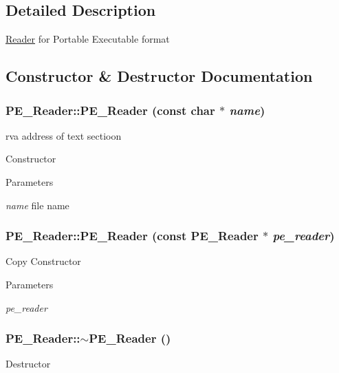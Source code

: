 \subsection{Detailed Description}
\hyperlink{classReader}{Reader} for Portable Executable format 

\subsection{Constructor \& Destructor Documentation}
\hypertarget{classPE__Reader_a3ee3c529ba07e5cfe8d288fa3ebfa4f9}{
\subsubsection[{PE\_\-Reader}]{\setlength{\rightskip}{0pt plus 5cm}PE\_\-Reader::PE\_\-Reader (const char $\ast$ {\em name})}}
\label{classPE__Reader_a3ee3c529ba07e5cfe8d288fa3ebfa4f9}


rva address of text sectioon 

Constructor 
\begin{DoxyParams}{Parameters}
\item[{\em name}]file name \end{DoxyParams}
\hypertarget{classPE__Reader_a49781859b63b5d08f49e306f62fc103d}{
\subsubsection[{PE\_\-Reader}]{\setlength{\rightskip}{0pt plus 5cm}PE\_\-Reader::PE\_\-Reader (const {\bf PE\_\-Reader} $\ast$ {\em pe\_\-reader})}}
\label{classPE__Reader_a49781859b63b5d08f49e306f62fc103d}
Copy Constructor 
\begin{DoxyParams}{Parameters}
\item[{\em pe\_\-reader}]\end{DoxyParams}
\hypertarget{classPE__Reader_a6fbfdcd447011a83ac2147874c8e8b4a}{
\subsubsection[{$\sim$PE\_\-Reader}]{\setlength{\rightskip}{0pt plus 5cm}PE\_\-Reader::$\sim$PE\_\-Reader ()}}
\label{classPE__Reader_a6fbfdcd447011a83ac2147874c8e8b4a}
Destructor 

